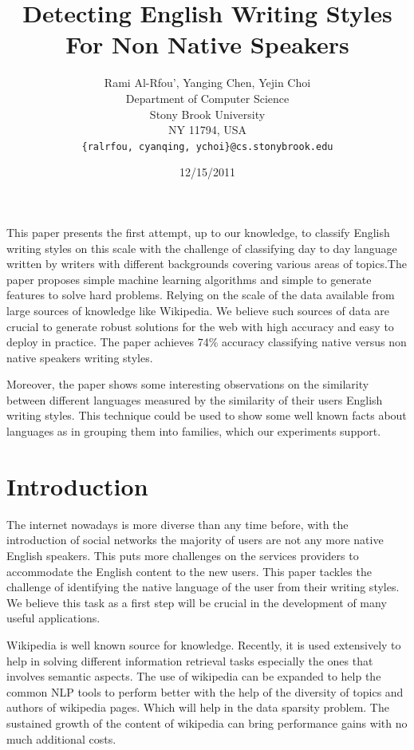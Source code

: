 \documentclass[11pt]{article}
\title{Detecting English Writing Styles For Non Native Speakers}
\author{Rami Al-Rfou', Yanging Chen, Yejin Choi \\
  Department of Computer Science \\
  Stony Brook University \\
  NY 11794, USA \\
  {\tt \{ralrfou, cyanqing, ychoi\}@cs.stonybrook.edu}}
\date{12/15/2011}
\begin{document}
\maketitle
\begin{abstract}
\end{abstract}


This paper presents the first attempt, up to our knowledge, to classify English
writing styles on this scale with the challenge of classifying day to day language written by writers with different backgrounds covering various areas of topics.The paper proposes simple machine learning algorithms and simple to generate features to solve hard problems. Relying on the scale of the data available from large sources of knowledge like Wikipedia. We believe such sources of data are crucial to generate robust solutions for the web with high accuracy and easy to deploy in practice. The paper achieves 74\% accuracy classifying native versus non native speakers writing styles.

Moreover, the paper shows some interesting observations on the similarity between different languages measured by the similarity of their users English writing styles. This technique could be used to show some well known facts about languages as in grouping them into families, which our experiments support.

\section{Introduction}
The internet nowadays is more diverse than any time before, with the introduction of social networks the majority of users are not any more native English speakers. This puts more challenges on the services providers to accommodate the English content to the new users. This paper tackles the challenge of identifying the native language of the user from their writing styles. We believe this task as a first step will be crucial in the development of many useful applications.

Wikipedia is well known source for knowledge. Recently, it is used extensively to help in solving different information retrieval tasks especially the ones that involves semantic aspects. The use of wikipedia can be expanded to help the common NLP tools to perform better with the help of the diversity of topics and authors of wikipedia pages. Which will help in the data sparsity problem. The sustained growth of the content of wikipedia can bring performance gains with no much additional costs.
\end{document}
